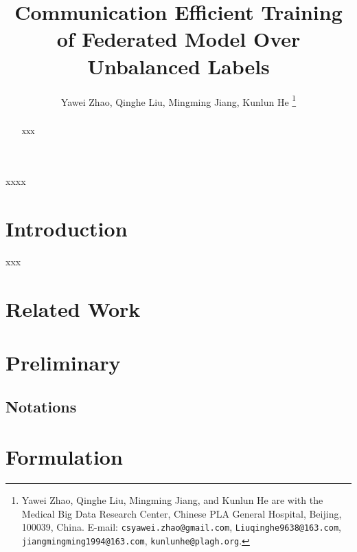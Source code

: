 \documentclass[journal]{IEEEtran}
\begin{document}
\title{Communication Efficient Training of Federated Model Over Unbalanced Labels}


\author{Yawei Zhao, Qinghe Liu, Mingming Jiang, Kunlun He
\thanks{Yawei Zhao, Qinghe Liu, Mingming Jiang, and Kunlun He are with the Medical Big Data Research Center, Chinese PLA General Hospital, Beijing, 100039, China. E-mail: \texttt{csyawei.zhao@gmail.com},  \texttt{Liuqinghe9638@163.com}, \texttt{jiangmingming1994@163.com}, \texttt{kunlunhe@plagh.org}.
}
}



\maketitle

\begin{abstract}
xxx

\end{abstract}

\begin{IEEEkeywords}
xxxx
\end{IEEEkeywords}


\IEEEpeerreviewmaketitle


\section{Introduction}
\label{sect_introduction}
xxx



\section{Related Work}



\section{Preliminary}


\subsection{Notations}






\section{Formulation}
\end{document}
